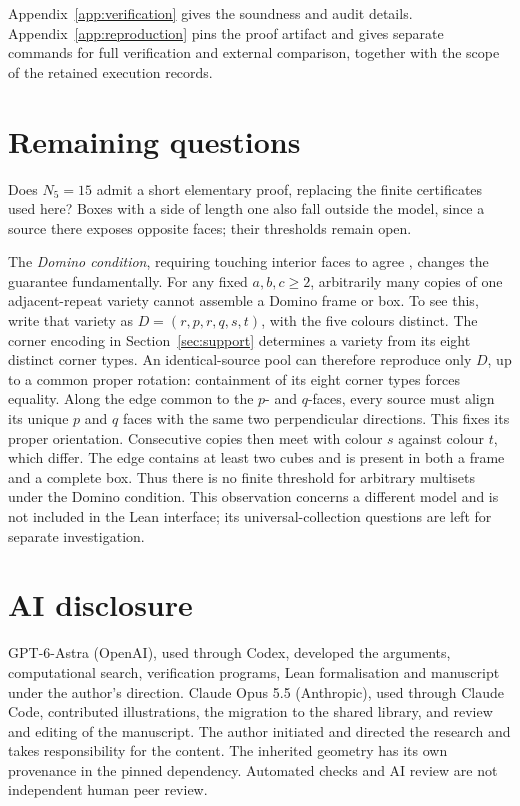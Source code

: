 \documentclass[11pt]{article}
\theoremstyle{remark}
\begin{document}
Appendix~\ref{app:verification} gives the soundness and audit details.
Appendix~\ref{app:reproduction} pins the proof artifact and gives separate
commands for full verification and external comparison, together with the
scope of the retained execution records.

\section{Remaining questions}
Does $N_5=15$ admit a short elementary proof, replacing the finite
certificates used here? Boxes with a side of length one also fall outside
the model, since a source there exposes opposite faces; their thresholds
remain open.

The \emph{Domino condition}, requiring touching interior faces to agree
\cite[Section~8]{BES},
changes the guarantee fundamentally. For any fixed $a,b,c\ge2$, arbitrarily
many copies of one adjacent-repeat variety cannot assemble a Domino frame
or box. To see this, write that variety as $D=(r,p,r,q,s,t)$, with the five
colours distinct. The corner encoding in Section~\ref{sec:support} determines
a variety from its eight distinct corner types. An identical-source pool
can therefore reproduce only $D$, up to a common proper rotation: containment
of its eight corner types forces equality. Along the edge common to
the $p$- and $q$-faces, every source must align its unique $p$ and $q$ faces
with the same two perpendicular directions. This fixes its proper orientation.
Consecutive copies then meet with colour $s$ against colour $t$, which differ.
The edge contains at least two cubes and is present in both a frame and a
complete box. Thus there is no finite threshold for arbitrary
multisets under the Domino condition. This observation concerns a different
model and is not included in the Lean interface; its universal-collection
questions are left for separate investigation.

\section*{AI disclosure}
GPT-6-Astra (OpenAI), used through Codex, developed the arguments, computational
search, verification programs, Lean formalisation and manuscript under the
author's direction. Claude Opus 5.5 (Anthropic), used through Claude Code,
contributed illustrations, the migration to the shared
 library, and review and editing of the manuscript.
The author initiated and directed the research and takes responsibility for
the content.
The inherited geometry has its own provenance in the pinned dependency.
Automated checks and AI review are not independent human peer review.
\end{document}
